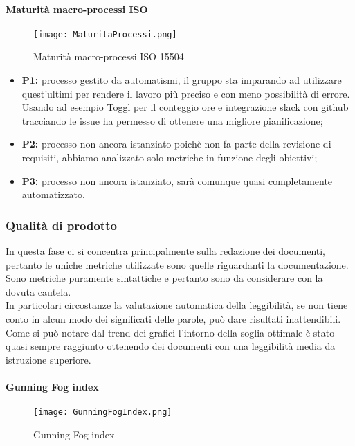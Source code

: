\paragraph{Maturità macro-processi ISO }
\hspace{15cm}
\begin{figure}[h!]
	\centering
	\texttt{[image: MaturitaProcessi.png]}
	\caption{Maturità macro-processi ISO 15504}
\end{figure}
\begin{itemize}
	\item \textbf{P1:} processo gestito da automatismi, il gruppo sta imparando ad utilizzare quest'ultimi per rendere il lavoro più preciso e con meno possibilità di errore. Usando ad esempio Toggl per il conteggio ore e integrazione slack con github tracciando le issue ha
	permesso di ottenere una migliore pianificazione;
	\item \textbf{P2:} processo non ancora istanziato poichè non fa parte della revisione di requisiti, abbiamo analizzato solo metriche in funzione degli obiettivi;
	\item \textbf{P3:} processo non ancora istanziato, sarà comunque quasi completamente automatizzato.
\end{itemize}
\clearpage
\subsubsection{Qualità di prodotto}
In questa fase ci si concentra principalmente sulla redazione dei documenti, pertanto le uniche metriche utilizzate sono quelle riguardanti la documentazione. \\
Sono metriche puramente sintattiche e pertanto sono da considerare con la dovuta cautela. \\
In particolari circostanze la valutazione automatica della leggibilità, se non tiene conto in alcun modo dei significati delle parole, può dare risultati inattendibili. \\
Come si può notare dal trend dei grafici l'intorno della soglia ottimale è stato quasi sempre raggiunto ottenendo dei documenti con una leggibilità media da istruzione superiore.
	\clearpage
\paragraph{Gunning Fog index}
\hspace{15cm}
\begin{figure}[!htbp]
	\centering
	\texttt{[image: GunningFogIndex.png]}
	\caption{Gunning Fog index}

\end{figure}
